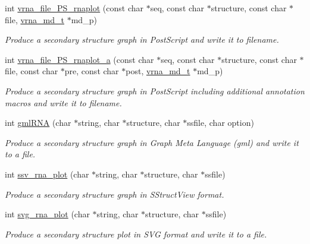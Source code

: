 \begin{DoxyCompactItemize}
\item 
int \hyperlink{group__plotting__utils_gabdc8f6548ba4a3bc3cd868ccbcfdb86a}{vrna\+\_\+file\+\_\+\+P\+S\+\_\+rnaplot} (const char $\ast$seq, const char $\ast$structure, const char $\ast$file, \hyperlink{group__model__details_ga1f8a10e12a0a1915f2a4eff0b28ea17c}{vrna\+\_\+md\+\_\+t} $\ast$md\+\_\+p)
\begin{DoxyCompactList}\small\item\em Produce a secondary structure graph in Post\+Script and write it to \textquotesingle{}filename\textquotesingle{}. \end{DoxyCompactList}\item 
int \hyperlink{group__plotting__utils_ga139a31dd0ba9fc6612431f67de901c31}{vrna\+\_\+file\+\_\+\+P\+S\+\_\+rnaplot\+\_\+a} (const char $\ast$seq, const char $\ast$structure, const char $\ast$file, const char $\ast$pre, const char $\ast$post, \hyperlink{group__model__details_ga1f8a10e12a0a1915f2a4eff0b28ea17c}{vrna\+\_\+md\+\_\+t} $\ast$md\+\_\+p)
\begin{DoxyCompactList}\small\item\em Produce a secondary structure graph in Post\+Script including additional annotation macros and write it to \textquotesingle{}filename\textquotesingle{}. \end{DoxyCompactList}\item 
int \hyperlink{group__plotting__utils_ga70834bc8c0aad4fe6824ff76ccb8f329}{gml\+R\+NA} (char $\ast$string, char $\ast$structure, char $\ast$ssfile, char option)
\begin{DoxyCompactList}\small\item\em Produce a secondary structure graph in Graph Meta Language (gml) and write it to a file. \end{DoxyCompactList}\item 
int \hyperlink{group__plotting__utils_gadd368528755f9a830727b680243541df}{ssv\+\_\+rna\+\_\+plot} (char $\ast$string, char $\ast$structure, char $\ast$ssfile)
\begin{DoxyCompactList}\small\item\em Produce a secondary structure graph in S\+Struct\+View format. \end{DoxyCompactList}\item 
int \hyperlink{group__plotting__utils_gae7853539b5df98f294b4af434e979304}{svg\+\_\+rna\+\_\+plot} (char $\ast$string, char $\ast$structure, char $\ast$ssfile)
\begin{DoxyCompactList}\small\item\em Produce a secondary structure plot in S\+VG format and write it to a file. \end{DoxyCompactList}\item 

\end{DoxyCompactItemize}
